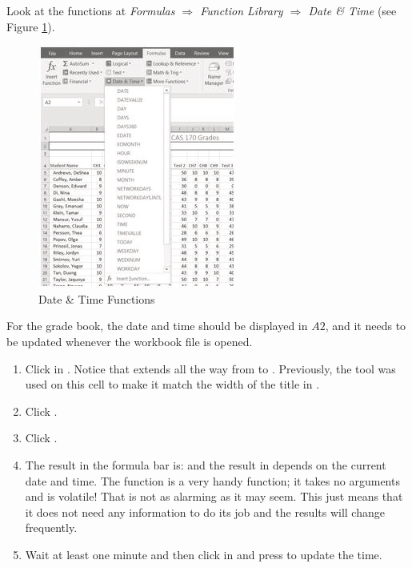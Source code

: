 Look at the functions at \textit{Formulas $ \Rightarrow $ Function Library $ \Rightarrow $ Date \& Time} (see Figure \ref{03:fig16}).

\begin{figure}[H]
	\centering
	\includegraphics[width=\maxwidth{.95\linewidth}]{gfx/ch03_fig16}
	\caption{Date \& Time Functions}
	\label{03:fig16}
\end{figure}

For the grade book, the date and time should be displayed in $ A2 $, and it needs to be updated whenever the workbook file is opened.

\begin{enumbox}
	\begin{enumerate}
		\item Click in . Notice that  extends all the way from  to . Previously, the  tool was used on this cell to make it match the width of the title in .
		\item Click . 
		\item Click .
		\item The result in the formula bar is:  and the result in  depends on the current date and time. The  function is a very handy function; it takes no arguments and is volatile! That is not as alarming as it may seem. This just means that it does not need any information to do its job and the results will change frequently. 
		\item Wait at least one minute and then click in  and press  to update the time.
	\end{enumerate}
\end{enumbox}
	
